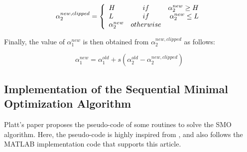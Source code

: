 \documentclass{ipol}
\begin{document}
\begin{equation}\label{eq:clippedvalues}
\alpha_2^{new,clipped} = \left\{ \begin{array}{l c r}
H & if & \alpha_2^{new} \geq H \\
L & if & \alpha_2^{new} \leq L \\
\alpha_2^{new} & otherwise & \\
\end{array}
\right.
\end{equation}

Finally, the value of $\alpha_1^{new}$ is then obtained from $\alpha_2^{new,clipped}$ as follows:

\begin{equation}
\alpha_1^{new} = \alpha_1^{old} + s(\alpha_2^{old} - \alpha_2^{new,clipped})
\end{equation}
\subsection{Implementation of the Sequential Minimal Optimization Algorithm}\label{sec:smo}

Platt's paper \cite{Platt:1998} proposes the pseudo-code of some routines to solve the SMO algorithm.
Here, the pseudo-code is highly inspired from \cite{Platt:1998}, and also follows the MATLAB implementation code that supports this article.
\end{document}
